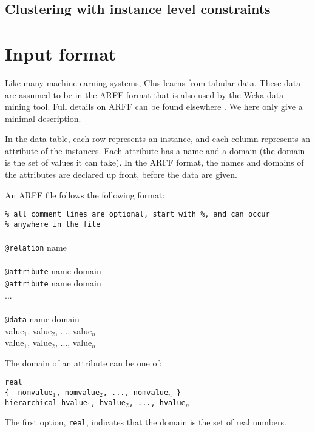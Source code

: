 \section{Clustering with instance level constraints}

\chapter{Input format}

Like many machine earning systems, Clus learns from tabular data.
These data are assumed to be in the ARFF format that is also used by the Weka data mining tool.  Full details on ARFF can be found elsewhere \cite{arff?}.
We here only give a minimal description.

In the data table, each row represents an instance, and each column represents an attribute of the instances.  Each attribute has a name and a domain (the domain is the set of values it can take).  In the ARFF format, the names and domains of the attributes are declared up front, before the data are given.

An ARFF file follows the following format:

\begin{tabbing}
{\tt \% all comment lines are optional, start with \%, and can occur }\\
{\tt \% anywhere in the file}\\
\\
{\tt @relation} name\\
\\
{\tt @attribute} name domain\\
{\tt @attribute} name domain\\
...\\
\\
{\tt @data} name domain\\
value$_1$, value$_2$, ..., value$_n$\\
value$_1$, value$_2$, ..., value$_n$\\
\end{tabbing}

The domain of an attribute can be one of:
\begin{tabbing}
\tt real\\
{\tt \{ } nomvalue$_1$, nomvalue$_2$, ..., nomvalue$_n$ {\tt \} }\\
{\tt hierarchical} hvalue$_1$, hvalue$_2$, ..., hvalue$_n$
\end{tabbing}

The first option, {\tt real}, indicates that the domain is the set of real numbers.

